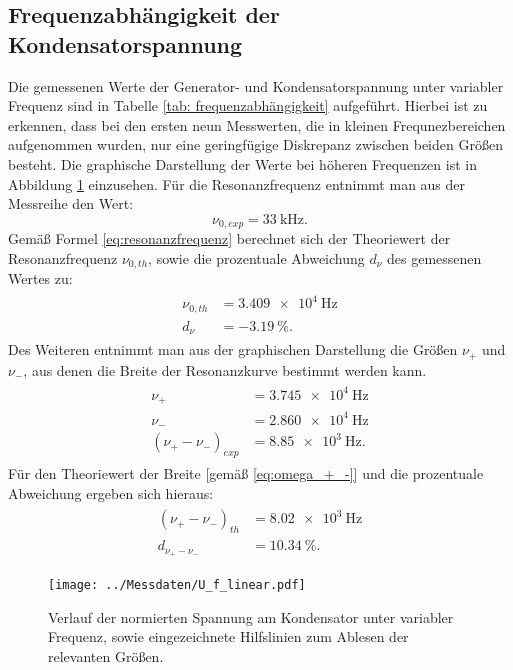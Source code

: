\subsection{Frequenzabhängigkeit der Kondensatorspannung}
Die gemessenen Werte der Generator- und Kondensatorspannung unter variabler Frequenz sind in Tabelle \ref{tab: frequenzabhängigkeit} aufgeführt.
Hierbei ist zu erkennen, dass bei den ersten neun Messwerten, die in kleinen Frequnezbereichen aufgenommen wurden, nur eine geringfügige
Diskrepanz zwischen beiden Größen besteht. Die graphische Darstellung der Werte bei höheren Frequenzen ist in Abbildung \ref{fig: spannungsverlauf_U_C}
einzusehen. Für die Resonanzfrequenz entnimmt man aus der Messreihe den Wert:
\begin{equation}
  \nu_{0, exp} = \SI{33}{\kilo\hertz}.
  \label{eq: exp_resonanzfrequenz}
\end{equation}
Gemäß Formel \eqref{eq:resonanzfrequenz} berechnet sich der Theoriewert der Resonanzfrequenz $\nu_{0, th}$, sowie die prozentuale Abweichung $d_{\nu}$ des gemessenen Wertes zu:
\begin{align}
  \begin{aligned}
  \nu_{0, th} &= \SI{3.409e4}{\hertz} \\
  d_{\nu} &= \SI{-3.19}{\percent}.
\end{aligned}
\label{eq: theo_resonanzfrequenz}
\end{align}
Des Weiteren entnimmt man aus der graphischen Darstellung die Größen $\nu_+$ und $\nu_-$, aus denen die Breite der Resonanzkurve bestimmt werden kann.
\begin{align}
  \begin{aligned}
  \nu_{+} &= \SI{3.745e4}{\hertz} \\
  \nu_{-} &= \SI{2.860e4}{\hertz} \\
  (\nu_{+}-\nu_{-})_{exp} &= \SI{8.85e3}{\hertz}.
\end{aligned}
\label{eq: breite_exp}
\end{align}
Für den Theoriewert der Breite [gemäß \eqref{eq:omega_+_-}] und die prozentuale Abweichung ergeben sich hieraus:
\begin{align}
  \begin{aligned}
  (\nu_{+}-\nu_{-})_{th} &= \SI{8.02e3}{\hertz}\\
  d_{\nu_{+}-\nu_{-}} &= \SI{10.34}{\percent}.
\end{aligned}
\label{eq: theo_breite}
\end{align}
\begin{figure}
  \centering
  \texttt{[image: ../Messdaten/U\_f\_linear.pdf]}
  \caption{Verlauf der normierten Spannung am Kondensator unter variabler Frequenz, sowie eingezeichnete Hilfslinien zum Ablesen der relevanten Größen.}
  \label{fig: spannungsverlauf_U_C}
\end{figure}
